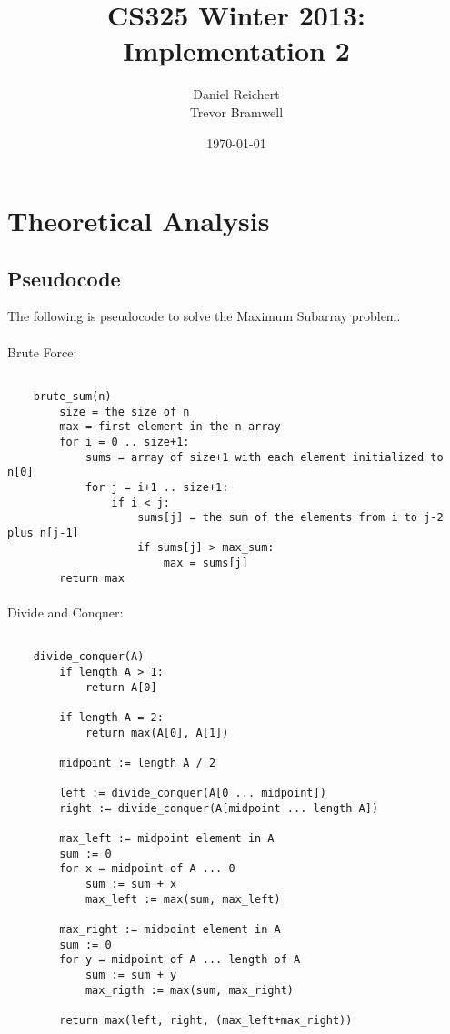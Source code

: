 \documentclass[12pt]{article}
\title{CS325 Winter 2013: Implementation 2}
\author{
    Daniel Reichert \\
    Trevor Bramwell
}
\date{\today}
\begin{document}
\maketitle

\section{Theoretical Analysis}
\subsection{Pseudocode}
    The following is pseudocode to solve the Maximum Subarray problem.
\paragraph{}
Brute Force:
    \begin{lstlisting}[basicstyle=\ttfamily\scriptsize,mathescape]

    brute_sum(n)
        size = the size of n
        max = first element in the n array
        for i = 0 .. size+1:
            sums = array of size+1 with each element initialized to n[0]
            for j = i+1 .. size+1:
                if i < j:
                    sums[j] = the sum of the elements from i to j-2 plus n[j-1]
                    if sums[j] > max_sum:
                        max = sums[j]
        return max

    \end{lstlisting}


\paragraph{}
Divide and Conquer:
    \begin{lstlisting}[basicstyle=\ttfamily\small,mathescape]

    divide_conquer(A)
        if length A > 1:
            return A[0]

        if length A = 2:
            return max(A[0], A[1])

        midpoint := length A / 2

        left := divide_conquer(A[0 ... midpoint])
        right := divide_conquer(A[midpoint ... length A])

        max_left := midpoint element in A
        sum := 0
        for x = midpoint of A ... 0
            sum := sum + x
            max_left := max(sum, max_left)

        max_right := midpoint element in A
        sum := 0
        for y = midpoint of A ... length of A
            sum := sum + y
            max_rigth := max(sum, max_right)

        return max(left, right, (max_left+max_right))

    \end{lstlisting}
        
\end{document}
